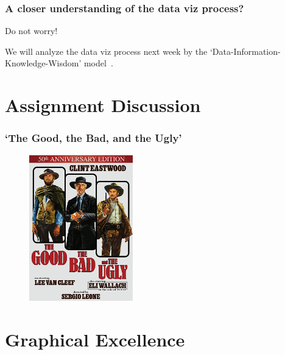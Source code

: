 \documentclass[notes, aspectratio=1610]{beamer}
\begin{document}
\begin{frame}
\begin{columns}
\begin{column}{0.45\textwidth}
		\end{column}
	\end{columns}
\end{frame}

\begin{frame}
	\frametitle{A closer understanding of the data viz process?}
	
	Do not worry!

	\vspace{2em}

	We will analyze the data viz process next week by the 
	`Data-Information-Knowledge-Wisdom' model~\cite{cairo2012}.	
\end{frame}

\section{Assignment Discussion}

\begin{frame}
    \frametitle{`The Good, the Bad, and the Ugly'}
    \begin{figure}
	\begin{small}
		\begin{center}
			\includegraphics[width=0.4\textwidth]{
				images/goog_bad_ugly.jpg
				}
		\end{center}
	\end{small}
    \end{figure}
\end{frame}

\section{Graphical Excellence}
\end{document}
